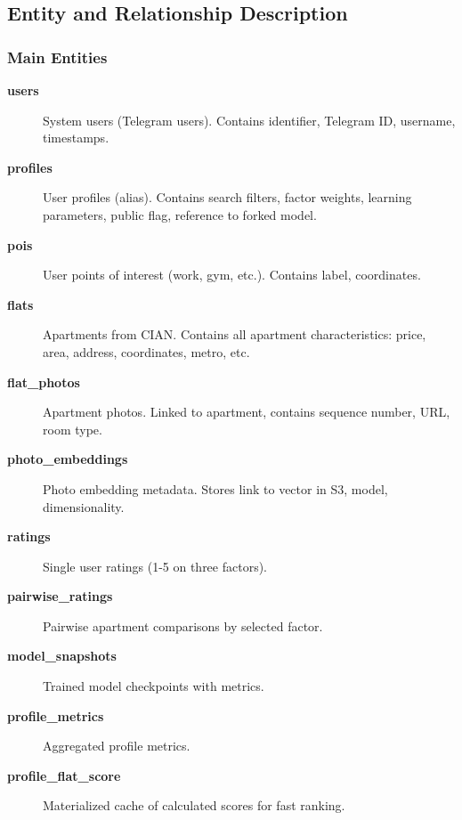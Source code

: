 \documentclass[12pt,a4paper]{article}
\begin{document}

\subsection{Entity and Relationship Description}

\subsubsection{Main Entities}

\begin{description}
    \item[\textbf{users}] System users (Telegram users). Contains identifier, Telegram ID, username, timestamps.
    
    \item[\textbf{profiles}] User profiles (alias). Contains search filters, factor weights, learning parameters, public flag, reference to forked model.
    
    \item[\textbf{pois}] User points of interest (work, gym, etc.). Contains label, coordinates.
    
    \item[\textbf{flats}] Apartments from CIAN. Contains all apartment characteristics: price, area, address, coordinates, metro, etc.
    
    \item[\textbf{flat\_photos}] Apartment photos. Linked to apartment, contains sequence number, URL, room type.
    
    \item[\textbf{photo\_embeddings}] Photo embedding metadata. Stores link to vector in S3, model, dimensionality.
    
    \item[\textbf{ratings}] Single user ratings (1-5 on three factors).
    
    \item[\textbf{pairwise\_ratings}] Pairwise apartment comparisons by selected factor.
    
    \item[\textbf{model\_snapshots}] Trained model checkpoints with metrics.
    
    \item[\textbf{profile\_metrics}] Aggregated profile metrics.
    
    \item[\textbf{profile\_flat\_score}] Materialized cache of calculated scores for fast ranking.
\end{description}
\end{document}
